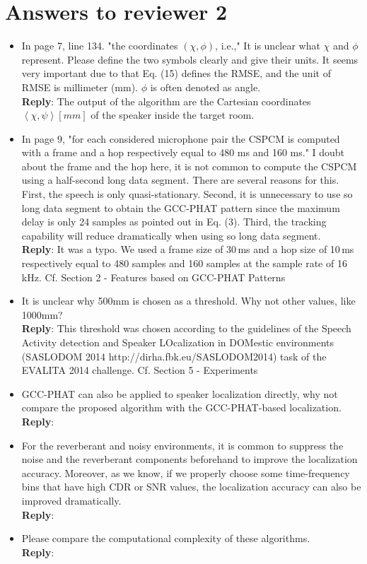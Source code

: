 \documentclass[11pt, technote, letterpaper, oneside, onecolumn]{IEEEtran}
\begin{document}
\section{Answers to reviewer 2}\label{sec:rev2}
\begin{itemize}
\item In page 7, line 134. "the coordinates $(\chi,\phi)$, i.e.," It is unclear what $\chi$ and $\phi$ represent. Please define the two symbols clearly and give their units. It seems very important due to that Eq. (15) defines the RMSE, and the unit of RMSE is millimeter (mm). $\phi$ is often denoted as angle.\\
\textbf{Reply}:  The output of the algorithm are the Cartesian coordinates $\left \langle \chi,\psi \right \rangle \left [mm\right ]$ of the speaker inside the target room.
\item  In page 9, "for each considered microphone pair the CSPCM is computed with a frame and a hop respectively equal to 480 ms and 160 ms." I doubt about the frame and the hop here, it is not common to compute the CSPCM using a half-second long data segment. There are several reasons for this. First, the speech is only quasi-stationary. Second, it is unnecessary to use so long data segment to obtain the GCC-PHAT pattern since the maximum delay is only 24 samples as pointed out in Eq. (3). Third, the tracking capability will reduce dramatically when using so long data segment.\\
\textbf{Reply}:  It was a typo. We used a frame size of 30\,ms and a hop size of 10\,ms respectively equal to 480 samples and 160 samples at the sample rate of 16\,kHz. Cf. Section 2 - Features based on GCC-PHAT Patterns
\item  It is unclear why 500mm is chosen as a threshold. Why not other values, like 1000mm?\\
\textbf{Reply}: This threshold was chosen according to the guidelines of the Speech Activity detection and Speaker LOcalization in DOMestic environments (SASLODOM 2014 http://dirha.fbk.eu/SASLODOM2014) task of the EVALITA 2014 challenge. Cf. Section 5 - Experiments
\item  GCC-PHAT can also be applied to speaker localization directly, why not compare the proposed algorithm with the GCC-PHAT-based localization. \\
\textbf{Reply}:
\item  For the reverberant and noisy environments, it is common to suppress the noise and the reverberant components beforehand to improve the localization accuracy. Moreover, as we know, if we properly choose some time-frequency bins that have high CDR or SNR values, the localization accuracy can also be improved dramatically.\\
\textbf{Reply}:

\item  Please compare the computational complexity of these algorithms.\\
\textbf{Reply}:

\end{itemize}
\end{document}
